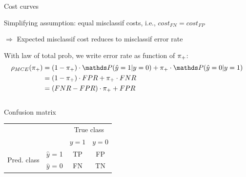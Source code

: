 \documentclass[11pt,compress,t,notes=noshow, xcolor=table]{beamer}
\begin{document}
\begin{vbframe}{Cost curves}
\small

Simplifying assumption: equal misclassif costs, i.e., $cost_{FN} = cost_{FP}$

$\Rightarrow$ Expected misclassif cost reduces to misclassif error rate

With law of total prob, we write error rate as function of $\pi_{+}$:
\begin{align*}
\rho_{MCE}(\rp)
&= (1 - \rp) \cdot \P(\hat y = 1 | y = 0) + \rp \cdot \P(\hat y = 0 | y = 1) \\
&= (1 - \rp) \cdot FPR + \rp \cdot FNR \\
&= (FNR - FPR) \cdot \rp + FPR
\end{align*}

\begin{columns}[T]
\begin{column}{0.5\textwidth}

\centerline{Confusion matrix}
\begin{tabular}{cc|cc}
    & &\multicolumn{2}{c}{True class} \\
    & & $y=1$ & $y=0$  \\
 \hline
    \multirow{2}{*}{\parbox{0.3cm}{Pred.  class}}& $\hat y$ = 1     & TP                 & FP\\
    & $\hat y$ = 0 & FN              & TN\\
\end{tabular}
\end{column}


\end{columns}
\end{vbframe}
\end{document}
